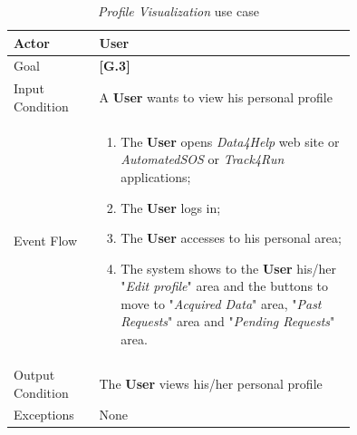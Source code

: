 \begin{center}
\begin{table}[H]
\begin{tabular}{ | l | p{0.75\linewidth} | }
  \hline
    Actor & \textbf{User} \\ \hline
    Goal & \textbf{[G.3]} \\ \hline
    Input Condition & A \textbf{User} wants to view his personal profile\\ \hline
    Event Flow & \begin{minipage}[t]{0.7\textwidth}
      \begin{enumerate}
        \item The \textbf{User} opens \textit{Data4Help} web site or \textit{AutomatedSOS} or \textit{Track4Run} applications;
        \item The \textbf{User} logs in;
        \item The \textbf{User} accesses to his personal area;
        \item The system shows to the \textbf{User} his/her "\textit{Edit profile}" area and the buttons to move to "\textit{Acquired Data}" area, "\textit{Past Requests}" area and "\textit{Pending Requests}" area.
      \end{enumerate}
    \smallskip
  \end{minipage} \\ \hline
  Output Condition & The \textbf{User} views his/her personal profile\\ \hline
  Exceptions & None \\ \hline
\end{tabular}
\caption{\textit{Profile Visualization} use case}
\label{table:profileVisualizationTable}
\end{table}
\end{center}

